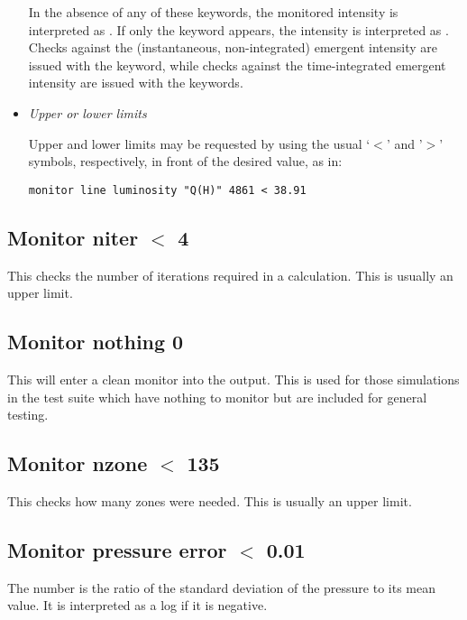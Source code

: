\begin{itemize}
In the absence of any of these keywords, the monitored intensity is
interpreted as .
If only the keyword  appears, the intensity is
interpreted as .
Checks against the (instantaneous, non-integrated) emergent intensity
are issued with the  keyword, while checks against
the time-integrated emergent intensity are issued with the
 keywords.

\item \emph{Upper or lower limits}

Upper and lower limits may be requested by using the usual `$<$' and '$>$'
symbols, respectively, in front of the desired value, as in:
%
\begin{verbatim}
monitor line luminosity "Q(H)" 4861 < 38.91
\end{verbatim}

\end{itemize}

\subsection{Monitor niter $<$ 4}

This checks the number of iterations required in a calculation.
This is usually an upper limit.

\subsection{Monitor nothing 0}

This will enter a clean monitor into the output.
This is used for those
simulations in the test suite which have nothing to
monitor but are included
for general testing.

\subsection{Monitor nzone $<$ 135}

This checks how many zones were needed.
This is usually an upper limit.

\subsection{Monitor pressure error $<$ 0.01}

The number is the ratio of the standard deviation of the pressure to
its mean value.
It is interpreted as a log if it is negative.

